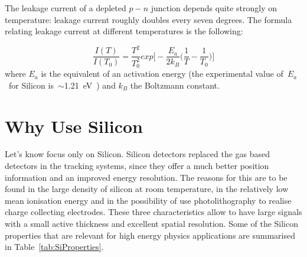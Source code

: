The leakage current of a depleted $p-n$ junction depends quite strongly on temperature: 
leakage current roughly doubles every seven degrees. The formula relating leakage 
current at different temperatures is the following:

\begin{equation}
\dfrac{I(T)}{I(T_0)}=\dfrac{T^2}{T_0^2}exp\Big[-\dfrac{E_a}{2k_B}\Big(\dfrac{1}{T}-\dfrac{1}{T_0}\Big)\Big]
\label{eq:IleakT}
\end{equation}
where $E_a$ is the equivalent of an activation energy (the experimental value of~$E_a$~for Silicon 
is~$\sim$1.21~eV~\cite{1748-0221-8-10-P10003}) and
$k_B$ the Boltzmann constant.

\section{Why Use Silicon}
\label{sec:Silicon}
Let's know focus only on Silicon. Silicon detectors replaced the  gas based detectors in the tracking systems, since they offer a much
 better position information and an improved energy resolution. The reasons for this are to be found 
in the large density of silicon at room temperature, in the relatively low mean ionisation energy and 
in the possibility of use photolithography to realise charge collecting electrodes. 
These three characteristics allow to have large signals with a small active thickness and 
excellent spatial resolution. Some of the Silicon properties that are relevant for high energy 
physics applications are summarised in Table~\ref{tab:SiProperties}.


